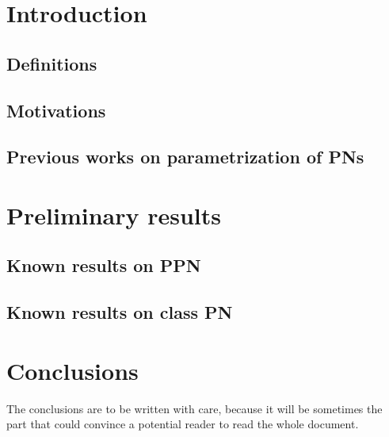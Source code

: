 \documentclass[11pt,a4paper,oneside]{book}
\theoremstyle{plain}
\theoremstyle{definition}
\begin{document}
\thispagestyle{empty} 
\setcounter{page}{0}
\tableofcontents


\mainmatter
\setcounter{page}{1}

\chapter{Introduction}


\section{Definitions}

\section{Motivations}


\section{Previous works on parametrization of \acp{PN}}


\chapter{Preliminary results}
\section{Known results on \ac{PPN}}

\section{Known results on class \ac{PN}}


\vspace*{0.5cm}
\chapter*{Conclusions}

The conclusions are to be written with care, because it will be sometimes the part that could convince a potential reader to read the whole document.

\appendix

\backmatter

\printindex %



\end{document}
